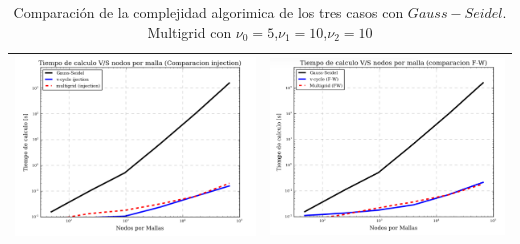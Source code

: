 \documentclass[letter,10pt]{article}
\begin{document}
\begin{table}[H]
\centering
\caption{Comparación de la complejidad algorimica de los tres casos con $Gauss-Seidel$. Multigrid con $\nu_0=5$,$\nu_1=10$,$\nu_2=10$  }
\begin{tabular}[t]{|c|c|}
\hline
\includegraphics[scale=0.55]{img/tvsncompin}
&
\includegraphics[scale=0.55]{img/tvsncompfw}\\
\hline
\end{tabular}
\label{comp10105}

\end{table}
\end{document}
